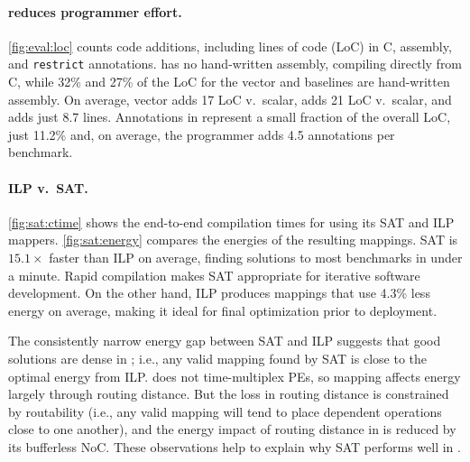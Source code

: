 \paragraph{\riptide reduces programmer effort.}
\autoref{fig:eval:loc} counts code additions, including lines of code (LoC) in C, assembly, and {\tt restrict} annotations.  
%
% 
\riptide has no hand-written assembly, compiling directly from C, while  32\% and
27\% of the LoC for the vector and \snafu baselines are hand-written assembly.
% 
On average, vector adds 17 LoC v.\ scalar, \snafu adds 21 LoC v.\ scalar, and
\riptide adds just 8.7 lines.
% 
Annotations in \riptide represent a small fraction of the overall LoC, just 11.2\%
and, on average, the programmer adds 4.5 annotations per benchmark.


\figRipTideSATResults
\paragraph{ILP v.\ SAT.}
\autoref{fig:sat:ctime} shows the end-to-end compilation times for \riptide using its SAT and ILP mappers.
% 
\autoref{fig:sat:energy} compares the energies of the resulting mappings.
% 
SAT is $15.1\times$ faster than ILP on average, finding solutions to most benchmarks in under a minute.
% 
Rapid compilation makes SAT appropriate for iterative software development.
% 
On the other hand, ILP produces mappings that use 4.3\% less energy on average, making it ideal for final optimization prior to deployment.

The consistently narrow energy gap between SAT and ILP suggests that good solutions are dense in \riptide;
i.e., any valid mapping found by SAT is close to the optimal energy from ILP.
%
\riptide does not time-multiplex PEs, so mapping affects energy largely through routing distance.
%
But the loss in routing distance is constrained by routability
(i.e., any valid mapping will tend to place dependent operations close to one another),
and the energy impact of routing distance in \riptide is reduced by its bufferless NoC.
%
These observations help to explain why SAT performs well in \riptide.

\figRipTideFINResults
